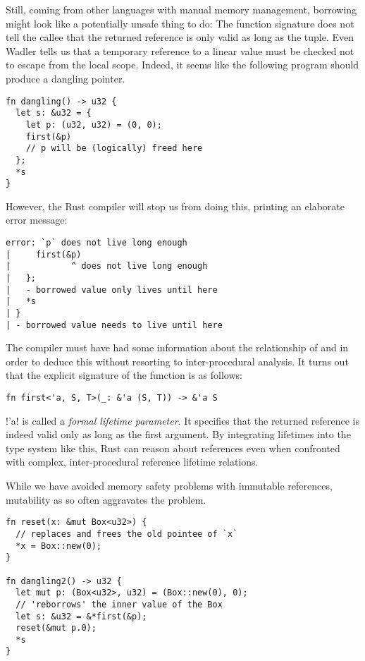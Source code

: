 Still, coming from other languages with manual memory management, borrowing might
look like a potentially unsafe thing to do: The function signature does not tell
the callee that the returned reference is only valid as long as the tuple. Even Wadler tells us that a temporary reference to a linear value
must be checked not to escape from the local scope. Indeed, it seems like the following program should produce a dangling pointer.

\begin{verbatim}
fn dangling() -> u32 {
  let s: &u32 = {
    let p: (u32, u32) = (0, 0);
    first(&p)
    // p will be (logically) freed here
  };
  *s
}
\end{verbatim}

However, the Rust compiler will stop us from doing this, printing an
elaborate error message:

\begin{verbatim}
error: `p` does not live long enough
|     first(&p)
|            ^ does not live long enough
|   };
|   - borrowed value only lives until here
|   *s
| }
| - borrowed value needs to live until here
\end{verbatim}

The compiler must have had some information about the relationship of 
and  in order to deduce this without resorting to inter-procedural
analysis. It turns out that the explicit signature of the  function is as follows:

\begin{verbatim}
fn first<'a, S, T>(_: &'a (S, T)) -> &'a S
\end{verbatim}

\rust!'a! is called a \emph{formal lifetime parameter}. It
specifies that the returned reference is indeed valid only as long as the first
argument. By integrating lifetimes into the type system like this, Rust can
reason about references even when confronted with complex, inter-procedural reference lifetime relations.

While we have avoided memory safety problems with immutable references, mutability
as so often aggravates the problem.

\begin{verbatim}
fn reset(x: &mut Box<u32>) {
  // replaces and frees the old pointee of `x`
  *x = Box::new(0);
}

fn dangling2() -> u32 {
  let mut p: (Box<u32>, u32) = (Box::new(0), 0);
  // 'reborrows' the inner value of the Box
  let s: &u32 = &*first(&p);
  reset(&mut p.0);
  *s
}
\end{verbatim}

